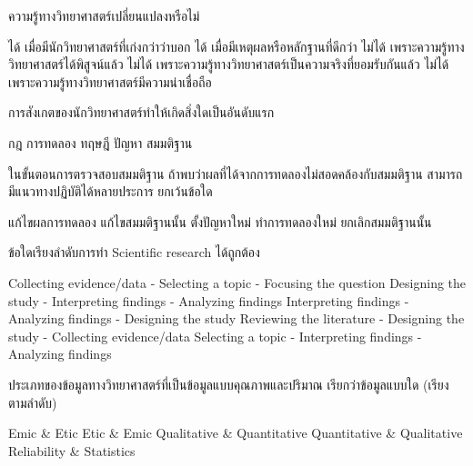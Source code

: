 \begin{questions}


\filbreak
  \question ความรู้ทางวิทยาศาสตร์เปลี่ยนแปลง\mbox{หรือไม่}
  \begin{choices}
    \choice ได้ เมื่อมีนักวิทยาศาสตร์ที่เก่งกว่าว่าบอก
    \choice ได้ เมื่อมีเหตุผลหรือหลักฐานที่ดีกว่า
    \choice ไม่ได้ เพราะความรู้ทางวิทยาศาสตร์ได้พิสูจน์แล้ว
    \choice ไม่ได้ เพราะความรู้ทางวิทยาศาสตร์เป็นความจริงที่ยอมรับกันแล้ว
    \choice ไม่ได้ เพราะความรู้ทางวิทยาศาสตร์มีความน่าเชื่อถือ
\end{choices}

\filbreak
  \question การสังเกตของนักวิทยาศาสตร์ทำให้เกิดสิ่งใดเป็นอันดับแรก
  \begin{choices}
    \choice กฎ
    \choice การทดลอง
    \choice ทฤษฎี
    \choice ปัญหา
    \choice สมมติฐาน
\end{choices}

\filbreak
  \question ในขั้นตอนการตรวจสอบสมมติฐาน ถ้าพบว่าผลที่ได้จากการทดลองไม่สอดคล้องกับสมมติฐาน สามารถมีแนวทางปฏิบัติได้หลายประการ ยกเว้นข้อใด
  \begin{choices}
    \choice แก้ไขผลการทดลอง
    \choice แก้ไขสมมติฐานนั้น
    \choice ตั้งปัญหาใหม่
    \choice ทำการทดลองใหม่
    \choice ยกเลิกสมมติฐานนั้น
\end{choices}

\filbreak
  \question ข้อใดเรียงลำดับการทำ Scientific research ได้ถูกต้อง
  \begin{choices}
    \choice Collecting evidence/data - Selecting a topic - Focusing the question
    \choice Designing the study - Interpreting findings - Analyzing findings
    \choice Interpreting findings - Analyzing findings - Designing the study
    \choice Reviewing the literature - Designing the study - Collecting evidence/data
    \choice Selecting a topic - Interpreting findings - Analyzing findings
\end{choices}

\filbreak
  \question ประเภทของข้อมูลทางวิทยาศาสตร์ที่เป็นข้อมูลแบบคุณภาพและปริมาณ เรียกว่าข้อมูลแบบใด (เรียงตามลำดับ)
  \begin{choices}
    \choice Emic \& Etic
    \choice Etic \& Emic
    \choice Qualitative \& Quantitative
    \choice Quantitative \& Qualitative
    \choice Reliability \& Statistics
\end{choices}


\end{questions}
